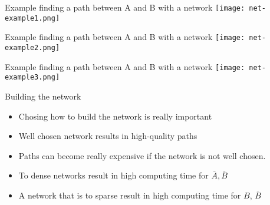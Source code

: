 \begin{frame}{Example finding a path between A and B with a network}
	\centering
	\texttt{[image: net-example1.png]}
\end{frame}
\begin{frame}{Example finding a path between A and B with a network}
	\centering
	\texttt{[image: net-example2.png]}
\end{frame}
\begin{frame}{Example finding a path between A and B with a network}
	\centering
	\texttt{[image: net-example3.png]}
\end{frame}

\begin{frame}{Building the network}
	\begin{itemize}
		\item Chosing how to build the network is really important 
		\item Well chosen network results in high-quality paths
		\item Paths can become really expensive if the network is not well chosen. 
		\item To dense networks result in high computing time for $\overline{A}, \overline{B}$
		\item A network that is to sparse result in high computing time for $B$, $\overline{B}$
	\end{itemize}
	
\end{frame}